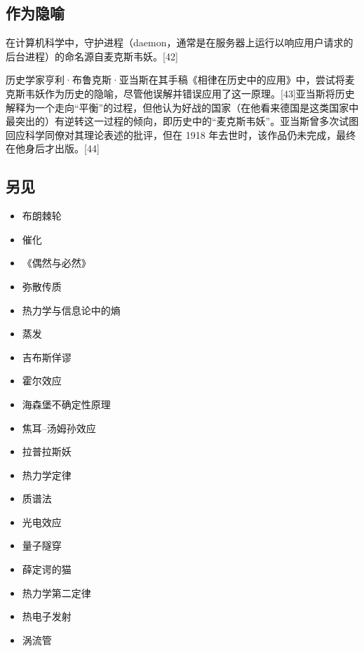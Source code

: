 \subsection{作为隐喻}
在计算机科学中，守护进程（daemon，通常是在服务器上运行以响应用户请求的后台进程）的命名源自麦克斯韦妖。[42]

历史学家亨利·布鲁克斯·亚当斯在其手稿《相律在历史中的应用》中，尝试将麦克斯韦妖作为历史的隐喻，尽管他误解并错误应用了这一原理。[43]亚当斯将历史解释为一个走向“平衡”的过程，但他认为好战的国家（在他看来德国是这类国家中最突出的）有逆转这一过程的倾向，即历史中的“麦克斯韦妖”。亚当斯曾多次试图回应科学同僚对其理论表述的批评，但在 1918 年去世时，该作品仍未完成，最终在他身后才出版。[44]
\subsection{另见}
\begin{itemize}
\item 布朗棘轮
\item 催化
\item 《偶然与必然》
\item 弥散传质
\item 热力学与信息论中的熵
\item 蒸发
\item 吉布斯佯谬
\item 霍尔效应
\item 海森堡不确定性原理
\item 焦耳–汤姆孙效应
\item 拉普拉斯妖
\item 热力学定律
\item 质谱法
\item 光电效应
\item 量子隧穿
\item 薛定谔的猫
\item 热力学第二定律
\item 热电子发射
\item 涡流管
\end{itemize}
